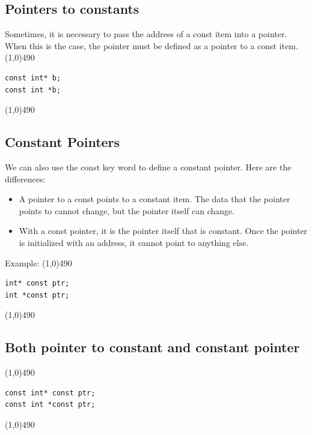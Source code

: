 \documentclass{report}
\begin{document}
    \bigbreak \noindent 
    \subsection{Pointers to constants}
    \bigbreak \noindent 
    Sometimes, it is necessary to pass the address of a const item into a pointer. When this is the case, the pointer must be defined as a pointer to a const item.
    \bigbreak \noindent 
    \line(1,0){490}
    \begin{verbatim}
const int* b; 
const int *b;
    \end{verbatim}
    \line(1,0){490}
    \bigbreak \noindent 
    \bigbreak \noindent 

    \pagebreak \bigbreak \noindent 
    \subsection{Constant Pointers}
    \bigbreak \noindent 
    We can also use the const key word to define a constant pointer. Here are the differences:
    \begin{itemize}
        \item A pointer to a const points to a constant item. The data that the pointer points to cannot change, but the pointer itself can change. 
        \item With a const pointer, it is the pointer itself that is constant.  Once the pointer is initialized with an address, it cannot point to anything else.
    \end{itemize}
    \bigbreak \noindent 
    Example:
    \bigbreak \noindent 
    \line(1,0){490}
    \begin{verbatim}
int* const ptr;
int *const ptr;
    \end{verbatim}
    \line(1,0){490}

    \bigbreak \noindent 
    \subsection{Both pointer to constant and constant pointer}
    \bigbreak \noindent 
    \line(1,0){490}
    \begin{verbatim}
const int* const ptr;
const int *const ptr;
    \end{verbatim}
    \line(1,0){490}
\end{document}
